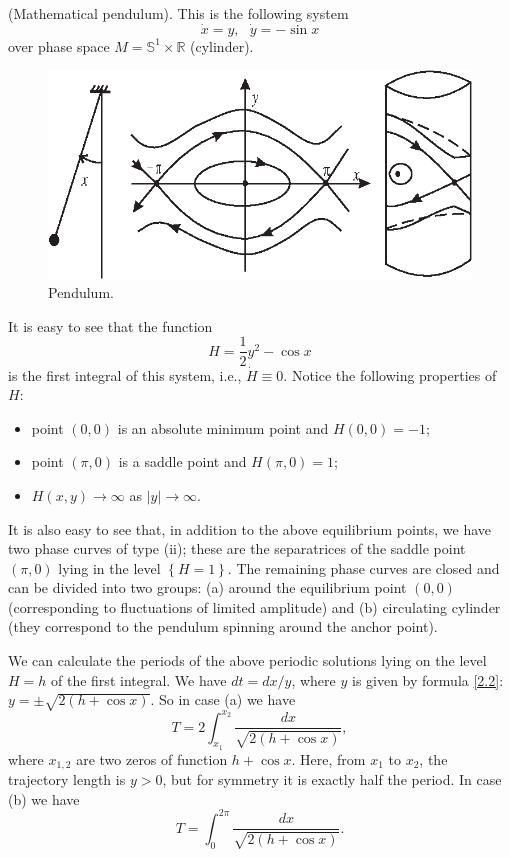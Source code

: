 \begin{example} (Mathematical pendulum).\label{example:2.2}
	This is the following system
	$$
	\dot{x}=y,\text{ \ \ }\dot{y}=-\sin x
	$$
	over phase space $M=\mathbb{S}^{1}\times \mathbb{R}$ (cylinder).
	\begin{figure}[!ht]
		\centering
		\includegraphics [scale=1.1]{jtr21}
		\caption{Pendulum.}
		\label{fig:2.1}
	\end{figure}
	
	It is easy to see that the function 
	\begin{equation}
	\label{2.2}
	H=\frac{1}{2}y^{2}-\cos x
	\end{equation}
	is the first integral of this system, i.e., $ \dot {H} \equiv 0 $. Notice the following properties of $ H: $
	\begin{itemize}
		\item point $\left( 0,0\right) $ is an absolute minimum point and $ H (0,0) = -1 $;
		\item point $\left( \pi ,0\right) $ is a saddle point and $ H (\pi, 0) = 1 $;
		\item $H(x,y)\rightarrow \infty $ as $\left\vert y\right\vert
		\rightarrow \infty $.
	\end{itemize}

It is also easy to see that, in addition to the above equilibrium points, we have two phase curves of type (ii); these are the separatrices of the saddle point $\left( \pi ,0\right) $ lying in the level $\left\{ H=1\right\}$. The remaining phase curves are closed and can be divided into two groups: (a) around the equilibrium point $(0,0)$ (corresponding to fluctuations of limited
amplitude) and (b) circulating cylinder (they correspond to the pendulum spinning around the anchor point).

We can calculate the periods of the above periodic solutions lying on the level $ H = h $ of the first integral. We have $ dt = dx / y$, where $ y $ is given by formula \eqref{2.2}: $y=\pm \sqrt{2(h+\cos x)}$. So in case (a) we have
$$
T=2\int_{x_{1}}^{x_{2}}\frac{dx}{\sqrt{2(h+\cos x)}},
$$
where $ x_ {1,2} $ are two zeros of function $ h + \cos x $. Here, from $ x_ {1} $ to $ x_ {2} $, the trajectory length is $ y> 0 $, but for symmetry it is exactly half the period. In case (b) we have
$$
T=\int_{0}^{2\pi }\frac{dx}{\sqrt{2(h+\cos x)}}.
$$


\end{example}
